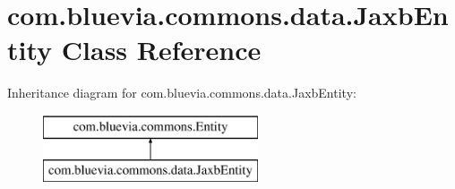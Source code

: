 \hypertarget{classcom_1_1bluevia_1_1commons_1_1data_1_1JaxbEntity}{
\section{com.bluevia.commons.data.JaxbEntity Class Reference}
\label{classcom_1_1bluevia_1_1commons_1_1data_1_1JaxbEntity}
}
Inheritance diagram for com.bluevia.commons.data.JaxbEntity:\begin{figure}[H]
\begin{center}
\leavevmode
\includegraphics[height=2.000000cm]{classcom_1_1bluevia_1_1commons_1_1data_1_1JaxbEntity}
\end{center}
\end{figure}
